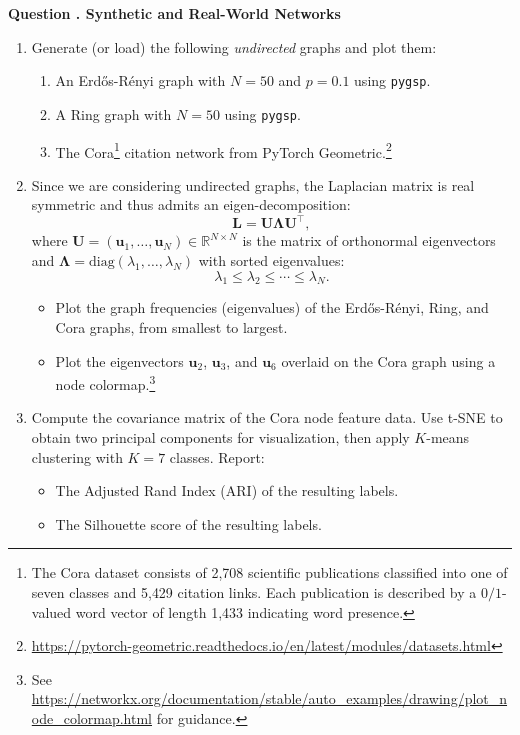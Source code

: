 \documentclass{article}
\newcounter{questioncounter}
\newcommand{\question}[1]{%
  \stepcounter{questioncounter}%
  \vspace{1em}%
  \noindent\textbf{\textcolor{deepblue}{\large Question \thequestioncounter.} #1}%
  \vspace{0.3em}%
}
\begin{document}
\vspace{1em}

\question{\textbf{Synthetic and Real-World Networks}}

\begin{enumerate}[leftmargin=1.5em]
    \item Generate (or load) the following \textit{undirected} graphs and plot them:
    \begin{enumerate}[leftmargin=1.5em]
        \item An Erd\H{o}s-R\'{e}nyi graph with $N = 50$ and $p = 0.1$ using \texttt{pygsp}.
        \item A Ring graph with $N = 50$ using \texttt{pygsp}.
        \item The Cora\footnote{The Cora dataset consists of 2{,}708 scientific publications classified into one of seven classes and 5{,}429 citation links. Each publication is described by a $0/1$-valued word vector of length 1{,}433 indicating word presence.} citation network from PyTorch Geometric.\footnote{\url{https://pytorch-geometric.readthedocs.io/en/latest/modules/datasets.html}}
    \end{enumerate}

    \item Since we are considering undirected graphs, the Laplacian matrix is real symmetric and thus admits an eigen-decomposition:
    \[
        \mathbf{L} = \mathbf{U}\mathbf{\Lambda}\mathbf{U}^\top,
    \]
    where $\mathbf{U} = (\mathbf{u}_1, \ldots, \mathbf{u}_N) \in \mathbb{R}^{N \times N}$ is the matrix of orthonormal eigenvectors and $\mathbf{\Lambda} = \mathrm{diag}(\lambda_1, \ldots, \lambda_N)$ with sorted eigenvalues:
    \[
        \lambda_1 \leq \lambda_2 \leq \cdots \leq \lambda_N.
    \]
    \begin{itemize}[leftmargin=1.5em]
        \item Plot the graph frequencies (eigenvalues) of the Erd\H{o}s-R\'{e}nyi, Ring, and Cora graphs, from smallest to largest.
        \item Plot the eigenvectors $\mathbf{u}_2$, $\mathbf{u}_3$, and $\mathbf{u}_6$ overlaid on the Cora graph using a node colormap.\footnote{See \url{https://networkx.org/documentation/stable/auto_examples/drawing/plot_node_colormap.html} for guidance.}
    \end{itemize}

    \item Compute the covariance matrix of the Cora node feature data. Use t-SNE to obtain two principal components for visualization, then apply $K$-means clustering with $K = 7$ classes. Report:
    \begin{itemize}[leftmargin=1.5em]
        \item The Adjusted Rand Index (ARI) of the resulting labels.
        \item The Silhouette score of the resulting labels.
    \end{itemize}


\end{enumerate}
\end{document}
